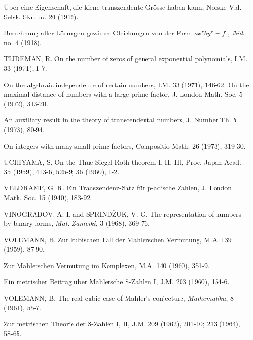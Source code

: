 \begin{hanglist}
    \item \hspace{1.5em} Über eine Eigenschaft, die kiene transzendente Grösse haben kann, Norske Vid. Selsk. Skr. no. 20 (1912).
    \item \hspace{1.5em} Berechnung aller Lösungen gewisser Gleichungen von der Form  $ax^r by^r = f$ , \textit{ibid}. no. 4 (1918).
    \item TIJDEMAN, R. On the number of zeros of general exponential polynomials, I.M. 33 (1971), 1-7.
    \item \hspace{1.5em} On the algebraic independence of certain numbers, I.M. 33 (1971), 146-62. On the maximal distance of numbers with a large prime factor, J. London Math. Soc. 5 (1972), 313-20.
    \item \hspace{1.5em} An auxiliary result in the theory of transcendental numbers, J. Number Th. 5 (1973), 80-94.
    \item \hspace{1.5em} On integers with many small prime factors, Compositio Math. 26 (1973), 319-30.
    \item UCHIYAMA, S. On the Thue-Siegel-Roth theorem I, II, III, Proc. Japan Acad. 35 (1959), 413-6, 525-9; 36 (1960), 1-2.
    \item VELDRAMP, G. R. Ein Transzendenz-Satz für p-adische Zahlen, J. London Math. Soc. 15 (1940), 183-92.
    \item VINOGRADOV, A. I. and SPRINDŽUK, V. G. The representation of numbers by binary forms, \textit{Mat. Zametki}, 3 (1968), 369-76.
    \item VOLEMANN, B. Zur kubischen Fall der Mahlerschen Vermutung, M.A. 139 (1959), 87-90.
    \item \hspace{1.5em} Zur Mahlerschen Vermutung im Komplexen, M.A. 140 (1960), 351-9.
    \item \hspace{1.5em} Ein metrischer Beitrag über Mahlersche S-Zahlen I, J.M. 203 (1960), 154-6.
    \item VOLEMANN, B. The real cubic case of Mahler's conjecture, \textit{Mathematika}, 8 (1961), 55-7.
    \item \hspace{1.5em} Zur metrischen Theorie der S-Zahlen I, II, J.M. 209 (1962), 201-10; 213 (1964), 58-65.

\end{hanglist}
